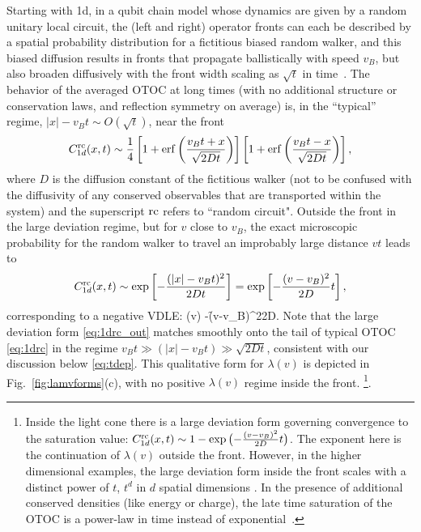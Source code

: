 \documentclass[aps,prl,reprint,superscriptaddress, longbibliography]{revtex4-1}
\newcommand{\vb}{v_B}
\begin{document}
Starting with 1d, in a qubit chain model whose dynamics are given by a random unitary local circuit, the (left and right) operator fronts can each be described by a spatial probability distribution for a fictitious biased random walker, and this biased diffusion results in fronts that propagate ballistically with speed $v_B$, but also broaden diffusively with the front width scaling as $\sqrt{t}$ in time~\cite{opspreadAdam, opspreadCurt}.  The behavior of the averaged OTOC at long times (with no additional structure or conservation laws, and reflection symmetry on average) is, in the ``typical'' regime, $|x| - \vb t \sim O(\sqrt{t})$, near the front
\begin{align}
C_{1d}^{\rm rc}(x,t) \sim \f{1}{4} \left[ 1+  {\rm erf} \left( \frac{\vb t +x}{ \sqrt{2Dt} } \right) \right]\left[1+  {\rm erf} \left( \frac{\vb t -x}{ \sqrt{2Dt} } \right) \right],
\label{eq:1drc}
\end{align}
where $D$ is the diffusion constant of the fictitious  walker (not to be confused with the diffusivity of any conserved observables that are transported within the system) and the superscript ${\rm rc}$ refers to ``random circuit". 
Outside the front in the large deviation regime, but for $v$ close to $v_B$, the exact microscopic probability \cite{opspreadAdam, opspreadCurt} for the random walker to travel an improbably large distance $vt$ leads to
\begin{align}
C_{1d}^{\rm rc}(x,t) %
\sim \exp\left[{-\frac{(|x|-\vb t)^2}{2Dt}}\right] = \exp \left[{-\frac{(v-\vb )^2}{2D} t}\right],
\label{eq:1drc_out} 
\end{align}
corresponding to a negative VDLE:
\be
\lambda(v) \approx -\f{(v-\vb)^2}{2D}.
\label{eq:1d_lambda}
\ee
Note that the large deviation form \eqref{eq:1drc_out}  matches smoothly onto the tail of  typical OTOC \eqref{eq:1drc} in the regime $v_B t \gg (|x|-v_B t) \gg \sqrt{2Dt}$, consistent with our discussion below \eqref{eq:tdep}. This qualitative form for $\lambda(v)$ is depicted in Fig.~\ref{fig:lamvforms}(c), with no positive $\lambda(v)$ regime inside the front. 
\footnote{{Inside the light cone there is a large deviation form governing convergence to the saturation value:   
${C_{1d}^{\rm rc}(x,t) \sim  1- \exp\big({-\frac{(v-\vb )^2}{2D} t}\big)}$. 
The exponent here is the continuation of $\lambda(v)$ outside the front. However, in the higher dimensional examples, the large deviation form inside the front scales with a distinct power of $t$, $t^d$ in $d$ spatial dimensions \cite{MajumdarKPZTail}.
In the presence of additional conserved densities (like energy or charge), the late time saturation of the OTOC is a power-law in time instead of exponential~\cite{KhemaniCons, TiborCons}.}}.
\end{document}
